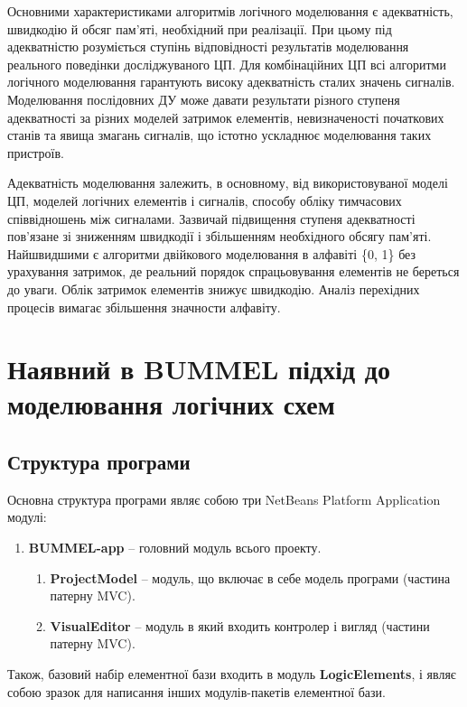 \documentclass[12pt,a4paper]{article}
\begin{document}
Основними характеристиками алгоритмів логічного моделювання є адекватність, швидкодію й обсяг пам'яті, необхідний при реалізації. При цьому під адекватністю розуміється ступінь відповідності результатів моделювання реального поведінки досліджуваного ЦП. Для комбінаційних ЦП всі алгоритми логічного моделювання гарантують високу адекватність сталих значень сигналів. Моделювання послідовних ДУ може давати результати різного ступеня адекватності за різних моделей затримок елементів, невизначеності початкових станів та явища змагань сигналів, що істотно ускладнює моделювання таких пристроїв.






Адекватність моделювання залежить, в основному, від використовуваної моделі ЦП, моделей логічних елементів і сигналів, способу обліку тимчасових співвідношень між сигналами. Зазвичай підвищення ступеня адекватності пов'язане зі зниженням швидкодії і збільшенням необхідного обсягу пам'яті. Найшвидшими є алгоритми двійкового моделювання в алфавіті \{0, 1\} без урахування затримок, де реальний порядок спрацьовування елементів не береться до уваги. Облік затримок елементів знижує швидкодію. Аналіз перехідних процесів вимагає збільшення значности алфавіту.





\section{Наявний в BUMMEL підхід до моделювання логічних схем}

\subsection{Структура програми}

Основна структура програми являє собою три NetBeans Platform Application модулі:
\begin{enumerate}
  \item \textbf{BUMMEL-app} -- головний модуль всього проекту.
  \begin{enumerate}
    \item \textbf{ProjectModel} -- модуль, що включає в себе модель програми (частина патерну MVC).
    \item \textbf{VisualEditor} -- модуль в який входить контролер і вигляд (частини патерну MVC).
  \end{enumerate}
\end{enumerate}
Також, базовий набір елементної бази входить в модуль \textbf{LogicElements}, і являє собою зразок для написання інших модулів-пакетів елементної бази.
\end{document}
